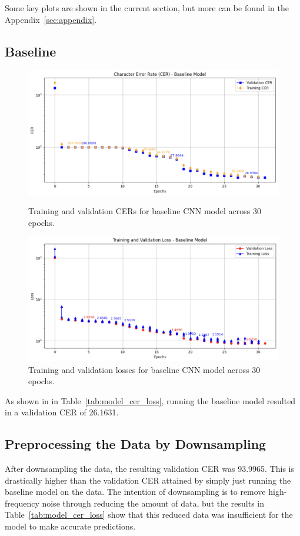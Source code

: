 \documentclass{article}
\begin{document}
Some key plots are shown in the current section, but more can be found in the Appendix~\ref{sec:appendix}.

\subsection{Baseline}
\begin{figure}[ht]
    \centering
    \begin{minipage}{0.48\textwidth}
        \centering
        \includegraphics[width=\linewidth]{Baseline_CER.png}
        \caption{Training and validation CERs for baseline CNN model across 30 epochs.}
    \end{minipage}
    \hfill
    \begin{minipage}{0.48\textwidth}
        \centering
        \includegraphics[width=\linewidth]{Baseline_loss.png}
        \caption{Training and validation losses for baseline CNN model across 30 epochs.}
    \end{minipage}
\end{figure}
As shown in in {Table~\ref{tab:model_cer_loss}}, running the baseline model resulted in a validation CER of 26.1631. 
\subsection{Preprocessing the Data by Downsampling}
After downsampling the data, the resulting validation CER was 93.9965. This is drastically higher than the validation CER attained by simply just running the baseline model on the data. The intention of downsampling is to remove high-frequency noise through reducing the amount of data, but the results in {Table~\ref{tab:model_cer_loss}} show that this reduced data was insufficient for the model to make accurate predictions.
\end{document}

